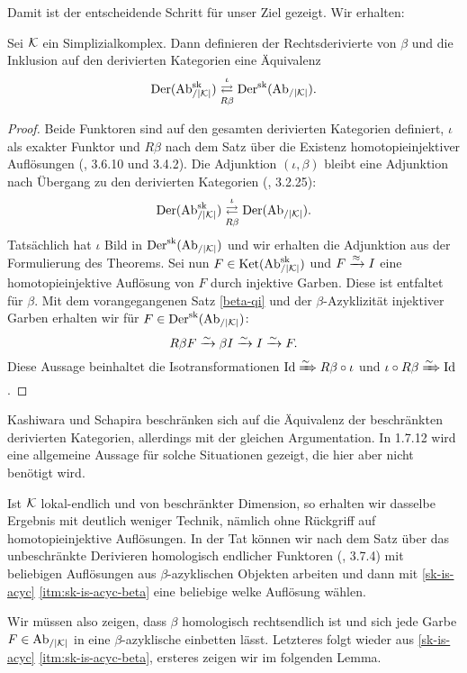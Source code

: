 Damit ist der entscheidende Schritt für unser Ziel gezeigt. Wir
erhalten:
\begin{theorem} \label{dersk-eq}
  Sei $\mathcal{K}$ ein Simplizialkomplex. Dann definieren der Rechtsderivierte
  von $\beta$ und die Inklusion auf den derivierten Kategorien eine
  Äquivalenz
  \[ \operatorname{Der}(\operatorname{Ab}_{/|\mathcal{K}|}^{\operatorname{sk}})
  \mathrel{\mathop{\rightleftarrows}^{\iota}_{R \beta}}
  \operatorname{Der}^{\operatorname{sk}}(\operatorname{Ab}_{/|\mathcal{K}|}). \]
\end{theorem}
\begin{proof}
  Beide Funktoren sind auf den gesamten derivierten Kategorien
  definiert, $\iota$ als exakter Funktor und $R\beta$ nach dem Satz
  über die Existenz homotopieinjektiver Auflösungen (\cite{TD}, 3.6.10
  und 3.4.2). Die Adjunktion $(\iota, \beta)$ bleibt eine Adjunktion
  nach Übergang zu den derivierten Kategorien (\cite{TD}, 3.2.25):
  \[ \operatorname{Der}(\operatorname{Ab}_{/|\mathcal{K}|}^{\operatorname{sk}})
  \mathrel{\mathop{\rightleftarrows}^{\iota}_{R \beta}}
  \operatorname{Der}(\operatorname{Ab}_{/|\mathcal{K}|}).
  \]
  Tatsächlich hat $\iota$ Bild in $\operatorname{Der}^{\operatorname{sk}}(\operatorname{Ab}_{/|\mathcal{K}|})$ und wir erhalten die
  Adjunktion aus der Formulierung des Theorems. Sei nun $F \in
  \operatorname{Ket}(\operatorname{Ab}_{/|\mathcal{K}|}^{\operatorname{sk}})$ und $F \xrightarrow{\approx} I$ eine homotopieinjektive Auflösung von
  $F$ durch injektive Garben. Diese ist entfaltet für $\beta$. Mit dem
  vorangegangenen Satz \ref{beta-qi} und der $\beta$-Azyklizität
  injektiver Garben erhalten wir für $F \in \operatorname{Der}^{\operatorname{sk}}(\operatorname{Ab}_{/|\mathcal{K}|})$:
  \[R \beta F \xrightarrow[]{\sim} \beta I \xrightarrow[]{\sim} I \xrightarrow[]{\sim} F. \]
  Diese Aussage beinhaltet die Isotransformationen $\operatorname{Id} \xRightarrow{\sim} R
  \beta \circ \iota$ und $\iota \circ R \beta \xRightarrow{\sim} \operatorname{Id}$.
\end{proof}
\begin{bem}
  Kashiwara und Schapira beschränken sich auf die Äquivalenz der
  beschränkten derivierten Kategorien, allerdings mit der gleichen
  Argumentation. In \cite{KS} 1.7.12 wird eine allgemeine Aussage für
  solche Situationen gezeigt, die hier aber nicht benötigt wird.
\end{bem}
\begin{bem} \label{dersk-eq-bounded-dim}
  Ist $\mathcal{K}$ lokal-endlich und von beschränkter Dimension, so erhalten
  wir dasselbe Ergebnis mit deutlich weniger Technik, nämlich ohne
  Rückgriff auf homotopieinjektive Auflösungen. In der Tat können wir
  nach dem Satz über das unbeschränkte Derivieren homologisch
  endlicher Funktoren (\cite{TG}, 3.7.4) mit beliebigen Auflösungen
  aus $\beta$-azyklischen Objekten arbeiten und dann mit
  \ref{sk-is-acyc} \ref{itm:sk-is-acyc-beta} eine beliebige welke
  Auflösung wählen.

  Wir müssen also zeigen, dass $\beta$ homologisch rechtsendlich ist
  und sich jede Garbe $F \in \operatorname{Ab}_{/|\mathcal{K}|}$ in eine $\beta$-azyklische
  einbetten lässt. Letzteres folgt wieder aus \ref{sk-is-acyc}
  \ref{itm:sk-is-acyc-beta}, ersteres zeigen wir im folgenden Lemma.
\end{bem}
